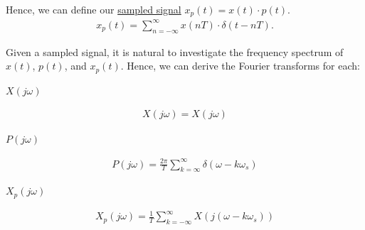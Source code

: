 \documentclass{article}
\newcommand{\centertext}[1]{\begin{center}#1\end{center}}
\newcommand{\jomega}{{j\omega}}
\begin{document}
Hence, we can define our \underline{sampled signal} $x_p(t) = x(t) \cdot p(t)$.
\begin{align*}
    x_p(t) = \sum_{n = - \infty}^\infty x(nT) \cdot \delta(t - nT).
\end{align*} 

Given a sampled signal, it is natural to investigate the frequency spectrum of 
$x(t)$, $p(t)$, and $x_p(t)$. Hence, we can derive the Fourier transforms for each:
\begin{multicols}{3}
    \centertext{\underline{$X(\jomega)$}}
    \begin{align*}
        X(\jomega) = X(\jomega)
    \end{align*}
    \vfill\null\columnbreak
    \centertext{\underline{$P(\jomega)$}}
    \begin{align*}
        P(\jomega) = \frac{2\pi}{T}\sum_{k = \infty}^\infty \delta(\omega - k\omega_s)
    \end{align*}
    \vfill\null\columnbreak
    \centertext{\underline{$X_p(\jomega)$}}
    \begin{align*}
        X_p(\jomega) = \frac{1}{T} \sum_{k = -\infty}^\infty X(j(\omega - k\omega_s))
    \end{align*}
    \vfill\null
\end{multicols}
\end{document}
